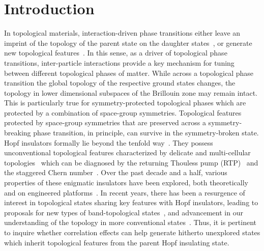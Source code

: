\documentclass[reprint,floatfix, twocolumn]{revtex4-1}
\begin{document}
\section{Introduction}
In topological materials, interaction-driven phase transitions either leave an imprint of the topology of the parent state on the daughter states~\cite{pesin2010mott, li2018topological, setty2024symmetry, setty2023topological}, or generate new topological features~\cite{raghu2008topological,Dzero2010,sun2009,Alicea2012, Beenakker2013,Volovik2019,lu2022interaction}.
In this sense, as a driver of topological phase transitions, inter-particle interactions provide a key mechanism  for tuning between different topological phases of matter. 
While across a topological phase transition the global topology of the respective ground states changes, the topology in  lower dimensional subspaces of the Brillouin zone may remain intact.
This is particularly true for symmetry-protected topological phases which are protected by a combination of space-group symmetries. 
Topological features protected by space-group symmetries that are preserved across a symmetry-breaking phase transition, in principle, can survive in the symmetry-broken state.
Hopf insulators formally lie beyond the tenfold way~\cite{moore2008}. They  possess unconventional topological features characterized by delicate and multi-cellular topologies~\cite{nelson2021a} which can be diagnosed by the returning Thouless pump (RTP)~\cite{nelson2022} and the staggered Chern number~\cite{tyner2024dipolar}. 
Over the past decade and a half, various properties of these enigmatic insulators have been explored, both theoretically and on engineered platforms~\cite{deng2013Hopf, kennedy2016,liu2017,deng2018,schuster2019a,schuster2019b,schuster2021,yuan2017,unal2019,wang2023}. In recent years, there has been a resurgence of interest in topological states sharing key features with Hopf insulators, leading to proposals for new  types of band-topological states~\cite{zhu2023z2,ezawa2017, tyner2024dipolar,graf2023, parasar2024delicate, zhuang2024berry}, and advancement in our understanding of the topology in more conventional states~\cite{zhu2023Delicate}.
Thus, it is pertinent to inquire whether correlation effects can help generate hitherto unexplored states which inherit topological features from the parent Hopf insulating state.
\end{document}
